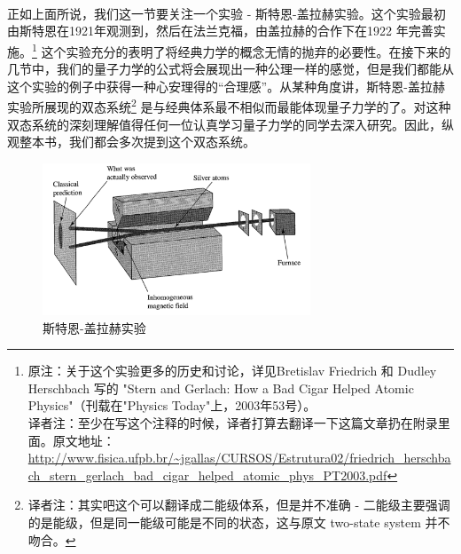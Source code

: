 \documentclass[UTF8,twoside]{ctexart}
\begin{document}
\noindent \\

\noindent {}  \\

\

\noindent 正如上面所说，我们这一节要关注一个实验 - 斯特恩-盖拉赫实验。这个实验最初由斯特恩在1921年观测到，然后在法兰克福，由盖拉赫的合作下在1922 年完善实施。\footnote{原注：关于这个实验更多的历史和讨论，详见Bretislav Friedrich 和 Dudley Herschbach 写的 "Stern and Gerlach: How a Bad Cigar Helped Atomic Physics"（刊载在"Physics Today"上，2003年53号）。\\ 译者注：至少在写这个注释的时候，译者打算去翻译一下这篇文章扔在附录里面。原文地址：
\url{http://www.fisica.ufpb.br/~jgallas/CURSOS/Estrutura02/friedrich_herschbach_stern_gerlach_bad_cigar_helped_atomic_phys_PT2003.pdf}}
这个实验充分的表明了将经典力学的概念无情的抛弃的必要性。在接下来的几节中，我们的量子力学的公式将会展现出一种公理一样的感觉，但是我们都能从这个实验的例子中获得一种心安理得的“合理感”。从某种角度讲，斯特恩-盖拉赫实验所展现的双态系统\footnote{译者注：其实吧这个可以翻译成二能级体系，但是并不准确 - 二能级主要强调的是能级，但是同一能级可能是不同的状态，这与原文 two-state system 并不吻合。} 是与经典体系最不相似而最能体现量子力学的了。对这种双态系统的深刻理解值得任何一位认真学习量子力学的同学去深入研究。因此，纵观整本书，我们都会多次提到这个双态系统。\\


\begin{figure}
\begin{centering}
\includegraphics[width = 8cm]{./Sakurai/Fig_1.1.png}
\caption{斯特恩-盖拉赫实验}
\label {Fig1.1}
\end{centering}
\end{figure}
\end{document}
